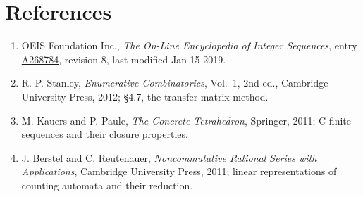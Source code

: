 \documentclass[11pt]{article}
\theoremstyle{definition}
\begin{document}
\section{References}

\begin{enumerate}

\item OEIS Foundation Inc., \emph{The On-Line Encyclopedia of Integer Sequences}, entry \href{https://oeis.org/A268784}{A268784}, revision 8, last modified Jan 15 2019.

\item R. P. Stanley, \emph{Enumerative Combinatorics}, Vol.~1, 2nd ed., Cambridge University Press, 2012; \S4.7, the transfer-matrix method.

\item M. Kauers and P. Paule, \emph{The Concrete Tetrahedron}, Springer, 2011; C-finite sequences and their closure properties.

\item J. Berstel and C. Reutenauer, \emph{Noncommutative Rational Series with Applications}, Cambridge University Press, 2011; linear representations of counting automata and their reduction.

\end{enumerate}
\end{document}
